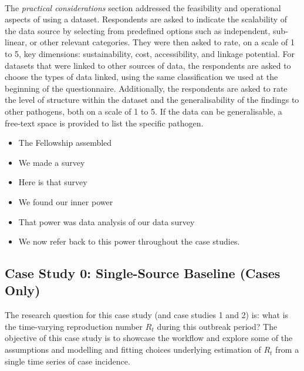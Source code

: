 \documentclass{article}
\begin{document}
\paragraph{}The \textit{practical considerations} section addressed the feasibility and operational aspects of using a dataset. Respondents are asked to indicate the scalability of the data source by selecting from predefined options such as independent, sub-linear, or other relevant categories. They were then asked to rate, on a scale of 1 to 5, key dimensions: sustainability, cost, accessibility, and linkage potential. For datasets that were linked to other sources of data, the respondents are asked to choose the types of data linked, using the same classification we used at the beginning of the questionnaire.  Additionally, the respondents are asked to rate the level of structure within the dataset and the generalisability of the findings to other pathogens, both on a scale of 1 to 5. If the data can be generalisable, a free-text space is provided to list the specific pathogen. 


\begin{itemize}
    \item The Fellowship assembled
    \item We made a survey
    \item Here is that survey
    \item We found our inner power
    \item That power was data analysis of our data survey
    \item We now refer back to this power throughout the case studies.
\end{itemize}


\subsection{Case Study 0: Single-Source Baseline (Cases Only)}


The research question for this case study (and case studies 1 and 2) is: what is the time-varying reproduction number $R_t$ during this outbreak period?
The objective of this case study is to showcase the workflow and explore some of the assumptions and modelling and fitting choices underlying estimation of $R_t$ from a single time series of case incidence.
\end{document}
